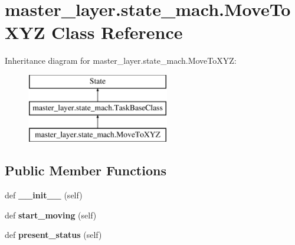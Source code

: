\hypertarget{classmaster__layer_1_1state__mach_1_1MoveToXYZ}{}\section{master\+\_\+layer.\+state\+\_\+mach.\+Move\+To\+X\+YZ Class Reference}
\label{classmaster__layer_1_1state__mach_1_1MoveToXYZ}
Inheritance diagram for master\+\_\+layer.\+state\+\_\+mach.\+Move\+To\+X\+YZ\+:\begin{figure}[H]
\begin{center}
\leavevmode
\includegraphics[height=3.000000cm]{classmaster__layer_1_1state__mach_1_1MoveToXYZ}
\end{center}
\end{figure}
\subsection*{Public Member Functions}
\begin{DoxyCompactItemize}
\item 
\mbox{\label{classmaster__layer_1_1state__mach_1_1MoveToXYZ_adac823d47df44667b2094e59e67350d3}} 
def {\bfseries \+\_\+\+\_\+init\+\_\+\+\_\+} (self)
\item 
\mbox{\label{classmaster__layer_1_1state__mach_1_1MoveToXYZ_a41cc58784894989aa81fba6c58e94715}} 
def {\bfseries start\+\_\+moving} (self)
\item 
\mbox{\label{classmaster__layer_1_1state__mach_1_1MoveToXYZ_a7645711937380d1ddae9516a21cb9d51}} 
def {\bfseries present\+\_\+status} (self)
\end{DoxyCompactItemize}
